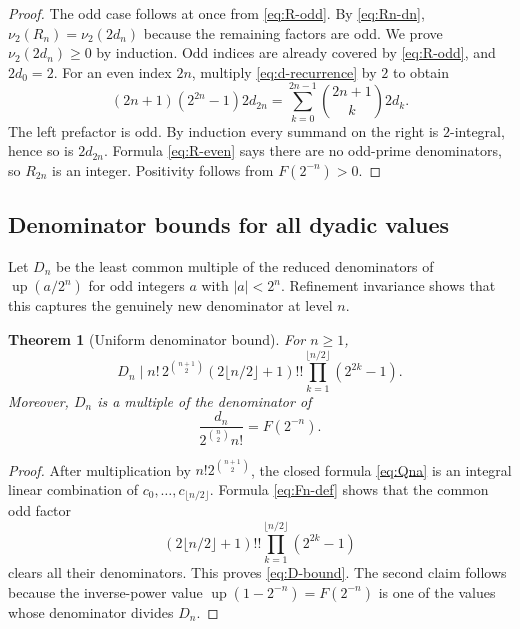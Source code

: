 \documentclass[11pt]{article}
\numberwithin{equation}{section}
\newtheorem{theorem}{Theorem}[section]
\theoremstyle{definition}
\theoremstyle{remark}
\newcommand{\upf}{\operatorname{up}}
\begin{document}
\begin{proof}
The odd case follows at once from \eqref{eq:R-odd}.  By
\eqref{eq:Rn-dn}, $\nu_2(R_n)=\nu_2(2d_n)$ because the remaining factors are
odd.  We prove $\nu_2(2d_n)\ge0$ by induction.  Odd indices are already
covered by \eqref{eq:R-odd}, and $2d_0=2$.  For an even index $2n$, multiply
\eqref{eq:d-recurrence} by $2$ to obtain
\begin{equation}\label{eq:2d-even-induction}
 (2n+1)(2^{2n}-1)2d_{2n}
 =\sum_{k=0}^{2n-1}\binom{2n+1}{k}2d_k.
\end{equation}
The left prefactor is odd.  By induction every summand on the right is
$2$-integral, hence so is $2d_{2n}$.  Formula \eqref{eq:R-even} says there are
no odd-prime denominators, so $R_{2n}$ is an integer.  Positivity follows from
$F(2^{-n})>0$.
\end{proof}

\subsection{Denominator bounds for all dyadic values}

Let $D_n$ be the least common multiple of the reduced denominators of
$\upf(a/2^n)$ for odd integers $a$ with $|a|<2^n$.  Refinement invariance
shows that this captures the genuinely new denominator at level $n$.

\begin{theorem}[Uniform denominator bound]\label{thm:denominator-bound}
For $n\ge1$,
\begin{equation}\label{eq:D-bound}
 D_n\mid
 n!\,2^{\binom{n+1}{2}}
 (2\lfloor n/2\rfloor+1)!!
 \prod_{k=1}^{\lfloor n/2\rfloor}(2^{2k}-1).
\end{equation}
Moreover, $D_n$ is a multiple of the denominator of
\begin{equation}\label{eq:D-lower}
 \frac{d_n}{2^{\binom n2}n!}=F(2^{-n}).
\end{equation}
\end{theorem}

\begin{proof}
After multiplication by $n!2^{\binom{n+1}{2}}$, the closed formula
\eqref{eq:Qna} is an integral linear combination of
$c_0,\ldots,c_{\lfloor n/2\rfloor}$.  Formula \eqref{eq:Fn-def} shows that the
common odd factor
\[
 (2\lfloor n/2\rfloor+1)!!
 \prod_{k=1}^{\lfloor n/2\rfloor}(2^{2k}-1)
\]
clears all their denominators.  This proves \eqref{eq:D-bound}.  The second
claim follows because the inverse-power value
$\upf(1-2^{-n})=F(2^{-n})$ is one of the values whose denominator divides
$D_n$.
\end{proof}
\end{document}
